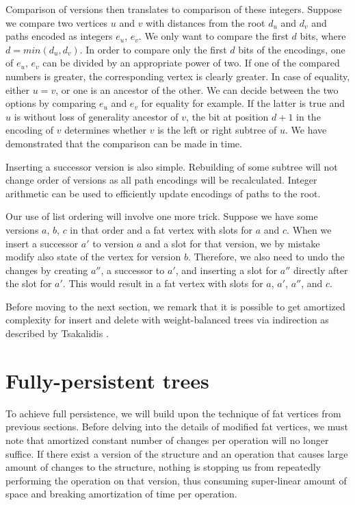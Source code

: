 Comparison of versions then translates to comparison of these integers.
Suppose we compare two vertices $u$ and $v$ with distances from the root $d_u$ and $d_v$ and paths encoded as integers $e_u$, $e_v$. 
We only want to compare the first $d$ bits, where $d = min(d_u,d_v)$. 
In order to compare only the first $d$ bits of the encodings, one of $e_u$, $e_v$ can be divided by an appropriate power of two. 
If one of the compared numbers is greater, the corresponding vertex is clearly greater. 
In case of equality, either $u = v$, or one is an ancestor of the other. We can decide between the two options by comparing $e_u$ and $e_v$ for equality for example. 
If the latter is true and $u$ is without loss of generality ancestor of $v$, the bit at position $d+1$ in the encoding of $v$ determines whether $v$ is the left or right subtree of $u$. 
We have demonstrated that the comparison can be made in  time. 

Inserting a successor version is also simple. Rebuilding of some subtree will not change order of versions as all path encodings will be recalculated. Integer arithmetic can be used to efficiently update encodings of paths to the root.

Our use of list ordering will involve one more trick. 
Suppose we have some versions $a$, $b$, $c$ in that order and a fat vertex with slots for $a$ and $c$. 
When we insert a successor $a'$ to version $a$ and a slot for that version, we by mistake modify also state of the vertex for version $b$. 
Therefore, we also need to undo the changes by creating $a''$, a successor to $a'$, and inserting a slot for $a''$ directly after the slot for $a'$. 
This would result in a fat vertex with slots for $a$, $a'$, $a''$, and $c$.

Before moving to the next section, we remark that it is possible to get  amortized complexity for insert and delete with weight-balanced trees via indirection as described by Tsakalidis \cite{list-ordering}.

\section{Fully-persistent trees}

To achieve full persistence, we will build upon the technique of fat vertices from previous sections. 
Before delving into the details of modified fat vertices, we must note that amortized constant number of changes per operation will no longer suffice. If there exist a version of the structure and an operation that causes large amount of changes to the structure, nothing is stopping us from repeatedly performing the operation on that version, thus consuming super-linear amount of space and breaking amortization of time per operation.


